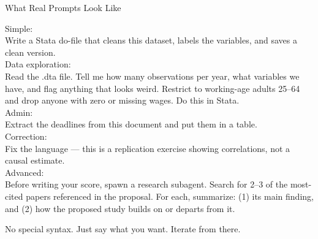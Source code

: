 \documentclass[aspectratio=169, 10pt]{beamer}
\begin{document}
\begin{frame}[fragile]{What Real Prompts Look Like}
\begin{tcolorbox}[colback=DarkSlate, colframe=DarkSlate, arc=3pt, left=6pt, right=6pt, top=3pt, bottom=3pt]
{\color{CoolGray}\ttfamily\tiny Simple:\color{white}\tiny\\
Write a Stata do-file that cleans this dataset, labels the variables, and saves a clean version.\\[3pt]
\color{CoolGray}\tiny Data exploration:\color{white}\tiny\\
Read the .dta file. Tell me how many observations per year, what variables we have, and flag anything that looks weird. Restrict to working-age adults 25--64 and drop anyone with zero or missing wages. Do this in Stata.\\[3pt]
\color{CoolGray}\tiny Admin:\color{white}\tiny\\
Extract the deadlines from this document and put them in a table.\\[3pt]
\color{CoolGray}\tiny Correction:\color{white}\tiny\\
Fix the language --- this is a replication exercise showing correlations, not a causal estimate.\\[3pt]
\color{CoolGray}\tiny Advanced:\color{white}\tiny\\
Before writing your score, spawn a research subagent. Search for 2--3 of the most-cited papers referenced in the proposal. For each, summarize: (1) its main finding, and (2) how the proposed study builds on or departs from it.
}
\end{tcolorbox}
\vskip2pt
{\small\color{CoolGray} No special syntax. Just say what you want. Iterate from there.}
\end{frame}
\end{document}
